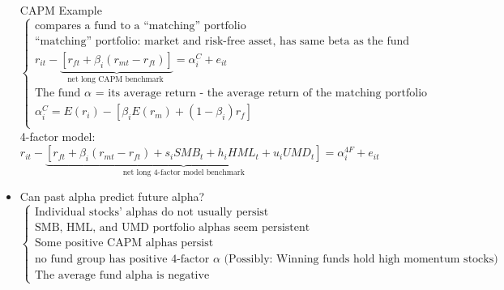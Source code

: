 \documentclass[10pt,landscape]{article}
\begin{document}
\begin{multicols}{2}
\begin{itemize}
            CAPM Example
            $
            \begin{cases}
                \text{compares a fund to a “matching” portfolio}\\
                \text{“matching” portfolio: market and risk-free asset, has same beta as the fund}\\
                r_{i t}-\underbrace{\left[r_{f t}+\beta_{i}\left(r_{m t}-r_{f t}\right)\right]}_{\text {net long CAPM benchmark }}
                =\alpha_{i}^{C}+e_{i t}\\
                \text{The fund $\alpha$ = its average return - the average return of the matching portfolio}\\
                \alpha_{i}^{C}
                =E\left(r_{i}\right)-\left[\beta_{i} E\left(r_{m}\right)+\left(1-\beta_{i}\right) r_{f}\right]\\
            \end{cases}
            $\\

            4-factor model: 
            $r_{i t}-\underbrace{\left[r_{f t}+\beta_{i}\left(r_{m t}-r_{f t}\right)+s_{i} S M B_{t}+h_{i} H M L_{t}+u_{i} U M D_{t}\right]}_{\text{net long 4-factor model benchmark}}
            =\alpha_{i}^{4 F}+e_{i t}$
        \item Can past alpha predict future alpha?\\
            $
            \begin{cases}
                \text{Individual stocks’ alphas do not usually persist}\\
                \text{SMB, HML, and UMD portfolio alphas seem persistent}\\
                \text{Some positive CAPM alphas persist}\\
                \text{no fund group has positive 4-factor $\alpha$ (Possibly: Winning funds hold high momentum stocks)}\\
                \text{The average fund alpha is negative}
            \end{cases}
            $
    \end{itemize}



    \end{multicols}
\end{document}
